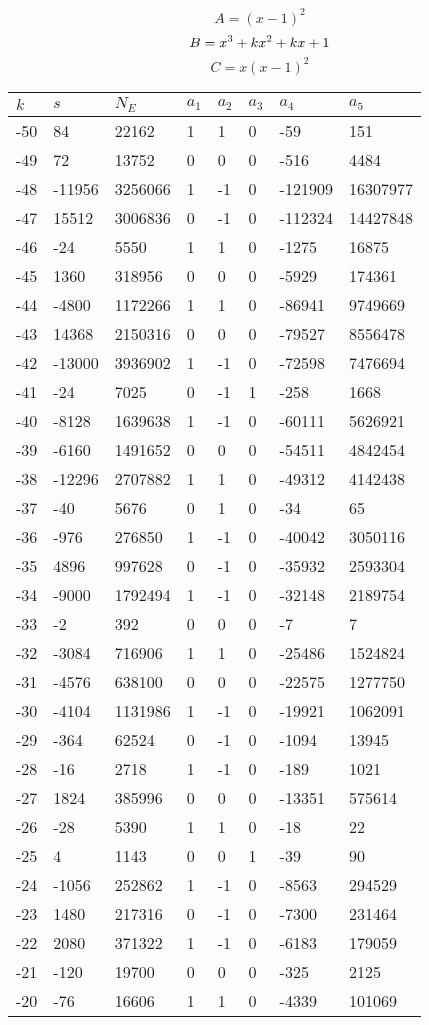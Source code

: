 \documentclass{amsart}
\begin{document}
$$A=(x
 - 1)^{2}$$
$$B=x^3
 + k\*x^2
 + k\*x
 + 1$$
$$C=x(x
 - 1)^{2}$$
\begin{longtable}{|l|l|l|lllll|}
\hline
$k$ & $s$ & $N_E$ & $a_1$ & $a_2$ & $a_3$ & $a_4$ & $a_5$\\
\hline
-50&84&22162&1&1&0&-59&151\\
-49&72&13752&0&0&0&-516&4484\\
-48&-11956&3256066&1&-1&0&-121909&16307977\\
-47&15512&3006836&0&-1&0&-112324&14427848\\
-46&-24&5550&1&1&0&-1275&16875\\
-45&1360&318956&0&0&0&-5929&174361\\
-44&-4800&1172266&1&1&0&-86941&9749669\\
-43&14368&2150316&0&0&0&-79527&8556478\\
-42&-13000&3936902&1&-1&0&-72598&7476694\\
-41&-24&7025&0&-1&1&-258&1668\\
-40&-8128&1639638&1&-1&0&-60111&5626921\\
-39&-6160&1491652&0&0&0&-54511&4842454\\
-38&-12296&2707882&1&1&0&-49312&4142438\\
-37&-40&5676&0&1&0&-34&65\\
-36&-976&276850&1&-1&0&-40042&3050116\\
-35&4896&997628&0&-1&0&-35932&2593304\\
-34&-9000&1792494&1&-1&0&-32148&2189754\\
-33&-2&392&0&0&0&-7&7\\
-32&-3084&716906&1&1&0&-25486&1524824\\
-31&-4576&638100&0&0&0&-22575&1277750\\
-30&-4104&1131986&1&-1&0&-19921&1062091\\
-29&-364&62524&0&-1&0&-1094&13945\\
-28&-16&2718&1&-1&0&-189&1021\\
-27&1824&385996&0&0&0&-13351&575614\\
-26&-28&5390&1&1&0&-18&22\\
-25&4&1143&0&0&1&-39&90\\
-24&-1056&252862&1&-1&0&-8563&294529\\
-23&1480&217316&0&-1&0&-7300&231464\\
-22&2080&371322&1&-1&0&-6183&179059\\
-21&-120&19700&0&0&0&-325&2125\\
-20&-76&16606&1&1&0&-4339&101069\\

\end{longtable}
\end{document}
